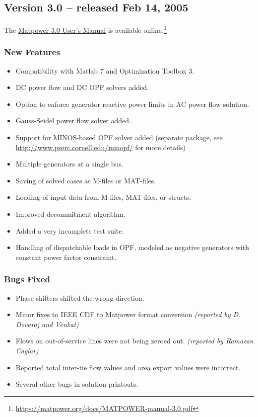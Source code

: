 \documentclass[12pt]{article}
\newcommand{\matlab}[0]{{\sc Matlab}}
\newcommand{\matpower}[0]{{\sc Matpower}}
\newcommand{\ot}[0]{{Optimization Toolbox}}
\numberwithin{equation}{section}
\numberwithin{table}{section}
\numberwithin{figure}{section}
\begin{document}
\begin{appendices}
\subsection{Version 3.0 -- released Feb 14, 2005}
\label{app:v30}

The \href{https://matpower.org/docs/MATPOWER-manual-3.0.pdf}{\matpower{} 3.0 User's Manual} is available online.\footnote{\url{https://matpower.org/docs/MATPOWER-manual-3.0.pdf}}

\subsubsection*{New Features}
\begin{itemize}
\item Compatibility with \matlab{} 7 and \ot{} 3.
\item DC power flow and DC OPF solvers added.
\item Option to enforce generator reactive power limits in AC power flow solution.
\item Gauss-Seidel power flow solver added.
\item Support for MINOS-based OPF solver added (separate package, see \\ \url{http://www.pserc.cornell.edu/minopf/} for more details)
\item Multiple generators at a single bus.
\item Saving of solved cases as M-files or MAT-files.
\item Loading of input data from M-files, MAT-files, or structs.
\item Improved decommitment algorithm.
\item Added a very incomplete test suite.
\item Handling of dispatchable loads in OPF, modeled as negative generators with constant power factor constraint.
\end{itemize}

\subsubsection*{Bugs Fixed}
\begin{itemize}
\item Phase shifters shifted the wrong direction.
\item Minor fixes to IEEE CDF to \matpower{} format conversion \emph{(reported by D. Devaraj and Venkat)}
\item Flows on out-of-service lines were not being zeroed out. \emph{(reported by Ramazan Caglar)}
\item Reported total inter-tie flow values and area export values were incorrect.
\item Several other bugs in solution printouts.
\end{itemize}



\end{appendices}
\end{document}
